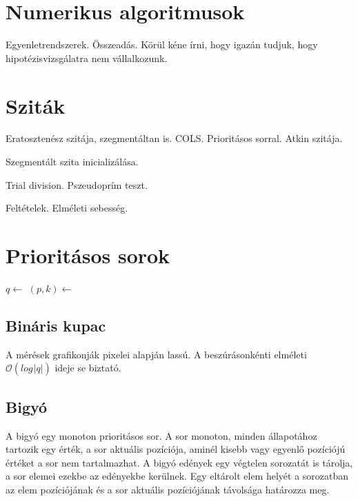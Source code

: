 \documentclass[12pt]{report}
\begin{document}
\section{Numerikus algoritmusok}

Egyenletrendszerek. Összeadás.
Körül kéne írni, hogy igazán tudjuk, hogy hipotézisvizsgálatra nem vállalkozunk.

\section{Sziták}

Eratosztenész szitája, szegmentáltan is. COLS. Prioritásos sorral. Atkin szitája.

Szegmentált szita inicializálása.

Trial division. Pszeudoprím teszt.

Feltételek. Elméleti sebesség.

\section{Prioritásos sorok}

\begin{algorithmic}[1]
\State $q \gets$ 
		\State $(p, k) \gets $ 
		\State {}
		\State {}
	\EndWhile
		\State {}
	\EndIf
\EndFor
\end{algorithmic}

\subsection{Bináris kupac}

A mérések grafikonják pixelei alapján lassú. A beszúrásonkénti elméleti
$\mathcal{O}(log_{}{|q|})$ ideje se biztató.

\subsection{Bigyó}

A bigyó egy monoton prioritásos sor.
A sor monoton, minden állapotához tartozik egy érték, a sor aktuális pozíciója,
aminél kisebb vagy egyenlő pozíciójú értéket a sor nem tartalmazhat.
A bigyó edények egy végtelen sorozatát is tárolja, a sor elemei ezekbe az edényekbe kerülnek.
Egy eltárolt elem helyét a sorozatban az elem pozíciójának
és a sor aktuális pozíciójának távolsága határozza meg.
\end{document}
